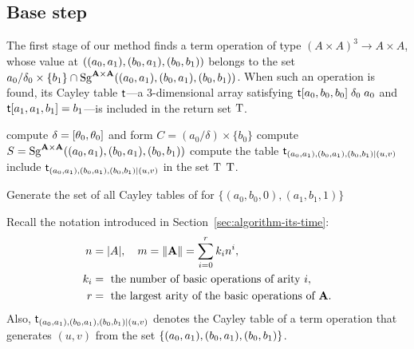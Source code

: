 \subsection{Base step} %
\label{sec:cc-ld-2}
The first stage of our method finds a term operation of type 
$(A\times A)^3 \to A\times A$, whose value at 
$((a_0,a_1),(b_0,a_1),(b_0,b_1))$ belongs to the set
$a_0/\delta_0 \times \{b_1\} \cap \operatorname{Sg}^{\mathbf{A}\times \mathbf{A}} ((a_0,a_1),(b_0,a_1),(b_0,b_1))$.
When such an operation is found, its Cayley table
$\mathsf{t}$---a $3$-dimensional array satisfying 
$\mathsf{t}[a_0,b_0, b_0] \mathrel{\delta_0} a_0$ and  $\mathsf{t}[a_1,a_1,b_1] = b_1$---is 
included in the return set $\operatorname{T}$.

\begin{algorithm}%


  compute $\delta = [ \theta_0 ,  \theta_0 ]$ and form $C= (a_0/\delta) \times \{b_0\}$\;
  compute $S=\operatorname{Sg}^{\mathbf{A}\times \mathbf{A}} ((a_0,a_1),(b_0,a_1),(b_0,b_1))$\;
   {
    compute the table $\mathsf{t}_{(a_0,a_1),(b_0,a_1),(b_0,b_1)\mid (u,v)}$\;
     {
    include $\mathsf{t}_{(a_0,a_1),(b_0,a_1),(b_0,b_1) \mid (u,v)}$ in the set $\operatorname{T}$\;
    }
  }
  \Return $\operatorname{T}$.
  \caption{Generate the set of all Cayley tables of \ldtos for $\{(a_0,b_0,0), (a_1, b_1, 1)\}$}
  \label{alg:ld-2}

\end{algorithm}


Recall the notation introduced in Section~\ref{sec:algorithm-its-time}: 
\begin{align*}
  n &= |A|, \quad m=\|\mathbf{A}\| = \sum_{i=0}^r k_i n^i,\\
k_i&= \text{ the number of basic operations of arity~$i$},\\ 
r &= \text{ the largest arity of the basic operations of $\mathbf{A}$.}
\end{align*}
Also, $\mathsf{t}_{(a_0,a_1),(b_0,a_1),(b_0,b_1) |(u,v)}$ denotes the Cayley table of a
term operation that generates $(u,v)$ from the set $\{(a_0,a_1),(b_0,a_1),(b_0,b_1) \}$.

